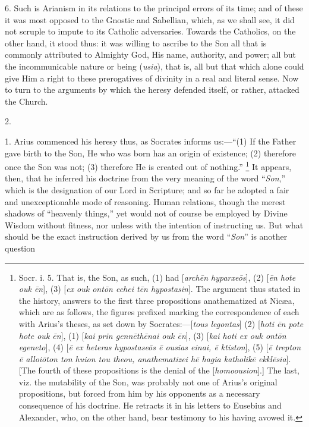 6. Such is Arianism in its relations to the principal errors of its
time; and of these it was most opposed to the Gnostic and Sabellian,
which, as we shall see, it did not scruple to impute to its Catholic
adversaries. Towards the Catholics, on the other hand, it stood thus:
it was willing to ascribe to the Son all that is commonly attributed
to Almighty God, His name, authority, and power; all but the
incommunicable nature or being (\emph{usia}), that is, all but that
which alone could give Him a right to these prerogatives of divinity
in a real and literal sense. Now to turn to the arguments by which the
heresy defended itself, or rather, attacked the Church.

2.

1. Arius commenced his heresy thus, as Socrates informs us:—``(1)
If the Father gave birth to the Son, He who was born has an origin of
existence; (2) therefore once the Son was not; (3) therefore He is
created out of nothing.'' \footnote{Socr. i. 5. That is, the Son, as such, (1)
had [\emph{arch\={e}n hyparxe\={o}s}], (2) [\emph{\={e}n hote ouk
\={e}n}], (3) [\emph{ex ouk ont\={o}n echei t\={e}n
hypostasin}]. The argument thus stated in the history, answers to
the first three propositions anathematized at Nicæa, which are as
follows, the figures prefixed marking the correspondence of each with
Arius's theses, as set down by Socrates:—[\emph{tous legontas}] (2)
[\emph{hoti \={e}n pote hote ouk \={e}n}], (1) [\emph{kai prin genn\={e}th\={e}nai
ouk \={e}n}], (3) [\emph{kai hoti ex ouk ont\={o}n egeneto}],
(4) [\emph{\={e} ex heteras hypostase\={o}s \={e} ousias einai, \={e}
ktiston}], (5) [\emph{\={e} trepton \={e} alloi\={o}ton ton
huion tou theou, anathematizei h\={e} hagia katholik\={e} ekkl\={e}sia}].
[The fourth of these propositions is the denial of the [\emph{homoousion}].]
The last, viz. the mutability of the Son, was probably not one of
Arius's original propositions, but forced from him by his opponents as
a necessary consequence of his doctrine. He retracts it in his letters
to Eusebius and Alexander, who, on the other hand, bear testimony to
his having avowed it.}
It appears, then, that he inferred his doctrine from the very
meaning of the word ``\emph{Son},'' which is the designation
of our Lord in Scripture; and so far he adopted a fair and
unexceptionable mode of reasoning. Human relations, though the merest
shadows of ``heavenly things,'' yet would not of course be
employed by Divine Wisdom without fitness, nor unless with the
intention of instructing us. But what should be the exact instruction
derived by us from the word ``\emph{Son}'' is another question
